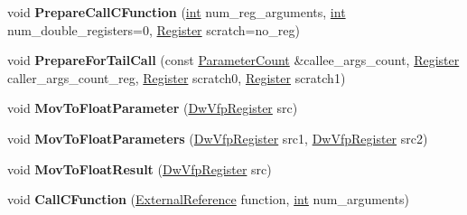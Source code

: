 \begin{DoxyCompactItemize}
\item 
\mbox{\label{classv8_1_1internal_1_1TurboAssembler_a96f82d9aa458005f823de61208158b73}} 
void {\bfseries Prepare\+Call\+C\+Function} (\mbox{\hyperlink{classint}{int}} num\+\_\+reg\+\_\+arguments, \mbox{\hyperlink{classint}{int}} num\+\_\+double\+\_\+registers=0, \mbox{\hyperlink{classv8_1_1internal_1_1Register}{Register}} scratch=no\+\_\+reg)
\item 
\mbox{\label{classv8_1_1internal_1_1TurboAssembler_a39e544d96166c4b553cc204fae211b68}} 
void {\bfseries Prepare\+For\+Tail\+Call} (const \mbox{\hyperlink{classv8_1_1internal_1_1ParameterCount}{Parameter\+Count}} \&callee\+\_\+args\+\_\+count, \mbox{\hyperlink{classv8_1_1internal_1_1Register}{Register}} caller\+\_\+args\+\_\+count\+\_\+reg, \mbox{\hyperlink{classv8_1_1internal_1_1Register}{Register}} scratch0, \mbox{\hyperlink{classv8_1_1internal_1_1Register}{Register}} scratch1)
\item 
\mbox{\label{classv8_1_1internal_1_1TurboAssembler_ab81edabe8b0b313ad74730d0ea6b7da4}} 
void {\bfseries Mov\+To\+Float\+Parameter} (\mbox{\hyperlink{classv8_1_1internal_1_1DwVfpRegister}{Dw\+Vfp\+Register}} src)
\item 
\mbox{\label{classv8_1_1internal_1_1TurboAssembler_a407184097b6604f137b8670f675b4be0}} 
void {\bfseries Mov\+To\+Float\+Parameters} (\mbox{\hyperlink{classv8_1_1internal_1_1DwVfpRegister}{Dw\+Vfp\+Register}} src1, \mbox{\hyperlink{classv8_1_1internal_1_1DwVfpRegister}{Dw\+Vfp\+Register}} src2)
\item 
\mbox{\label{classv8_1_1internal_1_1TurboAssembler_a732ae10193c2fc925fd1c62d806f537e}} 
void {\bfseries Mov\+To\+Float\+Result} (\mbox{\hyperlink{classv8_1_1internal_1_1DwVfpRegister}{Dw\+Vfp\+Register}} src)
\item 
\mbox{\label{classv8_1_1internal_1_1TurboAssembler_a46885d6523759af24eb058d5d8d39d44}} 
void {\bfseries Call\+C\+Function} (\mbox{\hyperlink{classv8_1_1internal_1_1ExternalReference}{External\+Reference}} function, \mbox{\hyperlink{classint}{int}} num\+\_\+arguments)

\end{DoxyCompactItemize}
